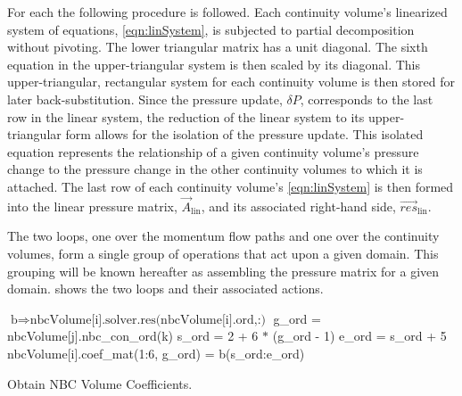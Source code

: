 For each  the following procedure is followed.
Each continuity volume's linearized system of equations, \eqref{eqn:linSystem}, is subjected to partial  decomposition without pivoting.
The lower triangular matrix has a unit diagonal.
The sixth equation in the upper-triangular system is then scaled by its diagonal.
This upper-triangular, rectangular system for each continuity volume is then stored for later back-substitution.
Since the pressure update, $\delta P$, corresponds to the last row in the linear system, the reduction of the linear system to its upper-triangular form allows for the isolation of the pressure update.
This isolated equation represents the relationship of a given continuity volume's pressure change to the pressure change in the other continuity volumes to which it is attached.
The last row of each continuity volume's \eqref{eqn:linSystem} is then formed into the linear pressure matrix, $\vec{A}_{\text{lin}}$, and its associated right-hand side, $\vec{res}_{\text{lin}}$.

The two loops, one over the momentum flow paths and one over the continuity volumes, form a single group of operations that act upon a given domain.
This grouping will be known hereafter as assembling the pressure matrix for a given domain.
 shows the two loops and their associated actions.

\begin{algo}[ht!]
\setlength{\baselineskip}{0.625\baselineskip}
\begin{algorithmic}[1]
	\Set $\text{b} \Rightarrow \text{nbcVolume[i].solver.res(nbcVolume[i].ord,:)}$
			\Set g\_ord = nbcVolume[j].nbc\_con\_ord(k)
			\Set s\_ord = 2 + 6 $*$ (g\_ord - 1)
			\Set e\_ord = s\_ord + 5
			\Set nbcVolume[i].coef\_mat(1:6, g\_ord) = b(s\_ord:e\_ord)
		\EndFor
	\EndFor
\EndFor
\end{algorithmic}
\caption{Obtain NBC Volume Coefficients.}
\label{alg:domDecompGetCoef}
\end{algo}

